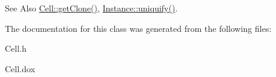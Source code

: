 \begin{DoxySeeAlso}{See Also}
\hyperlink{classHurricane_1_1Cell_a092f53c7f517ecc70d9ba375296c5d5b}{Cell\-::get\-Clone()}, \hyperlink{classHurricane_1_1Instance_adf28fcd01f6ff89c5435e83482f66d4c}{Instance\-::uniquify()}. 
\end{DoxySeeAlso}


The documentation for this class was generated from the following files\-:\begin{DoxyCompactItemize}
\item 
Cell.\-h\item 
Cell.\-dox\end{DoxyCompactItemize}
